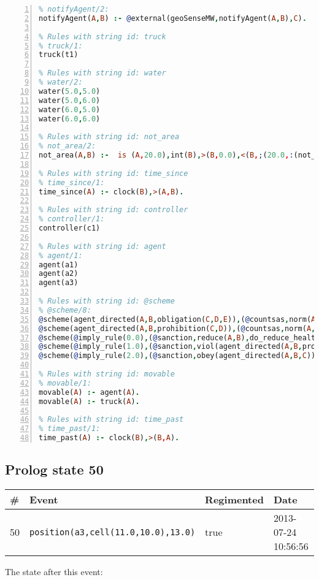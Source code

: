 \documentclass[11pt]{article}\usepackage[utf8]{inputenc}\usepackage{geometry}
\begin{document}
\begin{lstlisting}[language=Prolog, numbers=left]
% Rules with string id: notifyAgent
% notifyAgent/2:
notifyAgent(A,B) :- @external(geoSenseMW,notifyAgent(A,B),C).

% Rules with string id: truck
% truck/1:
truck(t1)

% Rules with string id: water
% water/2:
water(5.0,5.0)
water(5.0,6.0)
water(6.0,5.0)
water(6.0,6.0)

% Rules with string id: not_area
% not_area/2:
not_area(A,B) :-  is (A,20.0),int(B),>(B,0.0),<(B,;(20.0,:(not_area(A,B), is (-(B),20.0)))),int(A),>(A,0.0),<(A,;(20.0,:(area(A,B),-(int(A))))),int(B),>(A,0.0),>(B,0.0),<(A,21.0),<(B,21.0).

% Rules with string id: time_since
% time_since/1:
time_since(A) :- clock(B),>(A,B).

% Rules with string id: controller
% controller/1:
controller(c1)

% Rules with string id: agent
% agent/1:
agent(a1)
agent(a2)
agent(a3)

% Rules with string id: @scheme
% @scheme/8:
@scheme(agent_directed(A,B,obligation(C,D,E)),(@countsas,norm(A,B,F,obligation(C,D,E)),F),false,(listTrue(C)),(time_past(D)),false,[plus(viol(agent_directed(A,B,obligation(C,D,E))))|[]],[plus(obey(agent_directed(A,B,obligation(C,D,E))))|[]])
@scheme(agent_directed(A,B,prohibition(C,D)),(@countsas,norm(A,B,E,prohibition(C,D)),E),(listTrue(C)),false,(false),false,[plus(viol(agent_directed(A,B,prohibition(C,D))))|[]],[plus(obey(agent_directed(A,B,prohibition(C,D))))|[]])
@scheme(@imply_rule(0.0),(@sanction,reduce(A,B),do_reduce_health(A,B),notifyAgent(A,changed(status))),true,false,false,false,[min(reduce(A,B))|[]],[])
@scheme(@imply_rule(1.0),(@sanction,viol(agent_directed(A,B,prohibition(C,D))),do_sanction(D)),true,false,false,false,[min(viol(agent_directed(A,B,prohibition(C,D))))|[]],[])
@scheme(@imply_rule(2.0),(@sanction,obey(agent_directed(A,B,C))),true,false,false,false,[min(obey(agent_directed(A,B,C)))|[]],[])

% Rules with string id: movable
% movable/1:
movable(A) :- agent(A).
movable(A) :- truck(A).

% Rules with string id: time_past
% time_past/1:
time_past(A) :- clock(B),>(B,A).

\end{lstlisting}
\clearpage 
\subsection{Prolog state 50}
\begin{table}[ht]
\centering 
\begin{tabular}{l l l l} 
\textbf{\#} & \textbf{Event} & \textbf{Regimented} & \textbf{Date} \\ [0.5ex] 
\hline
50&\texttt{position(a3,cell(11.0,10.0),13.0)}&true&2013-07-24 10:56:56\\ [1ex] \hline\end{tabular}
\end{table}
The state after this event:
\end{document}
